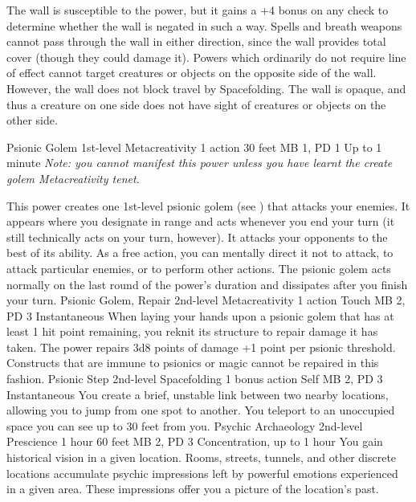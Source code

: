 The wall is susceptible to the  power,
but it gains a +4 bonus on any check to determine whether
the wall is negated in such a way. Spells and breath weapons
cannot pass through the wall in either direction, since the
wall provides total cover (though they could damage it). Powers
which ordinarily do not require line of effect cannot target
creatures or objects on the opposite side of the wall. However,
the wall does not block travel by Spacefolding. The wall is
opaque, and thus a creature on one side does not have sight
of creatures or objects on the other side.

\DndPowerHeader%
    {Psionic Golem\label{pwr:psionic_golem}}
    {1st-level Metacreativity}
    {1 action}
    {30 feet}
    {MB 1, PD 1}
    {Up to 1 minute}
\textit{Note: you cannot manifest this power
unless you have learnt the create golem Metacreativity tenet.}

This power creates one 1st-level psionic golem
(see )
that attacks your enemies. It appears where you designate
in range and acts whenever you end your turn (it still technically
acts on your turn, however). It attacks your opponents to
the best of its ability. As a free action, you can mentally
direct it not to attack, to attack particular enemies, or
to perform other actions. The psionic golem acts normally
on the last round of the power's duration and dissipates
after you finish your turn.
\DndPowerHeader%
    {Psionic Golem, Repair\label{pwr:psionic_golem_repair}}
    {2nd-level Metacreativity}
    {1 action}
    {Touch}
    {MB 2, PD 3}
    {Instantaneous}
When laying your hands upon a psionic golem
that has at least 1 hit point remaining, you reknit its structure
to repair damage it has taken. The power repairs 3d8 points
of damage +1 point per psionic threshold. Constructs that
are immune to psionics or magic cannot be repaired in this
fashion.
\DndPowerHeader%
    {Psionic Step\label{pwr:psionic_step}}
    {2nd-level Spacefolding}
    {1 bonus action}
    {Self}
    {MB 2, PD 3}
    {Instantaneous}
You create a brief, unstable link between
two nearby locations, allowing you to jump from one spot to
another. You teleport to an unoccupied space you can see up
to 30 feet from you.
\DndPowerHeader%
    {Psychic Archaeology\label{pwr:psychic_archaeology}}
    {2nd-level Prescience}
    {1 hour}
    {60 feet}
    {MB 2, PD 3}
    {Concentration, up to 1 hour}
You gain historical vision in a given location.
Rooms, streets, tunnels, and other discrete locations accumulate
psychic impressions left by powerful emotions experienced
in a given area. These impressions offer you a picture of
the location's past.

